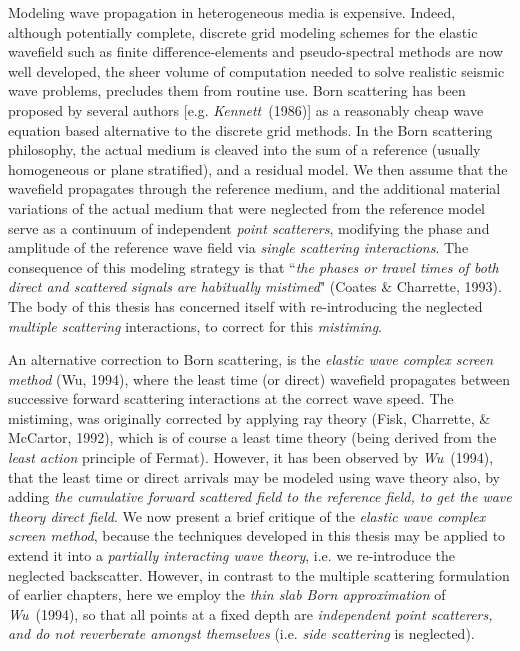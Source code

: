Modeling wave propagation in heterogeneous media is expensive. Indeed, 
although potentially complete,  discrete grid modeling schemes for the elastic wavefield such as 
finite difference-elements and pseudo-spectral methods are now well developed, the 
sheer volume of computation needed to solve realistic seismic wave 
problems, precludes them from routine use.
Born scattering has been proposed by several authors [e.g. {\em 
Kennett\/}~(1986)] as a reasonably cheap wave equation based alternative 
to the discrete grid methods. In the Born scattering philosophy,
the actual medium is cleaved into the sum of a reference (usually homogeneous or 
plane stratified), and a residual model. We then assume that the 
wavefield propagates through the reference medium, and the additional 
material variations of the actual medium that were neglected from the 
reference model serve as a continuum of independent {\em point scatterers\/}, 
modifying the phase and amplitude of the reference wave field via  {\em single 
scattering interactions}. 
 The consequence of this modeling strategy is that
``{\em the phases or travel times of both direct and scattered signals are 
habitually mistimed\/}" (Coates \& Charrette, 1993). The body of this 
thesis has concerned itself with re-introducing the neglected {\em 
multiple scattering\/} interactions, to correct for  this {\em mistiming}.

An alternative correction to Born scattering,  is the 
{\em elastic wave complex screen method\/} (Wu, 1994), where
the least time (or direct) wavefield propagates between successive forward scattering 
interactions at the correct wave speed. The mistiming, was originally 
corrected by applying ray theory (Fisk, Charrette, \& McCartor, 1992),
 which is of course a least time theory 
(being derived from the {\em least action\/} principle of Fermat). 
However, it has been observed by {\em Wu\/}~(1994), that 
the least time or direct arrivals may be modeled using wave theory also, 
by adding {\em the cumulative forward scattered field to the reference 
field, to get the wave theory direct field}. We now present a brief 
critique of the {\em elastic wave complex screen method\/}, because the 
techniques developed in this thesis may be applied to extend it into a 
{\em partially interacting wave theory}, i.e. we re-introduce the 
neglected backscatter. However, in contrast to the multiple scattering 
formulation of earlier chapters, here we employ the {\em thin slab Born 
approximation\/} of {\em Wu\/}~(1994), so that all  points at a fixed depth are {\em 
independent point scatterers, and do not reverberate amongst themselves} 
(i.e. {\em side scattering\/} is neglected). 


